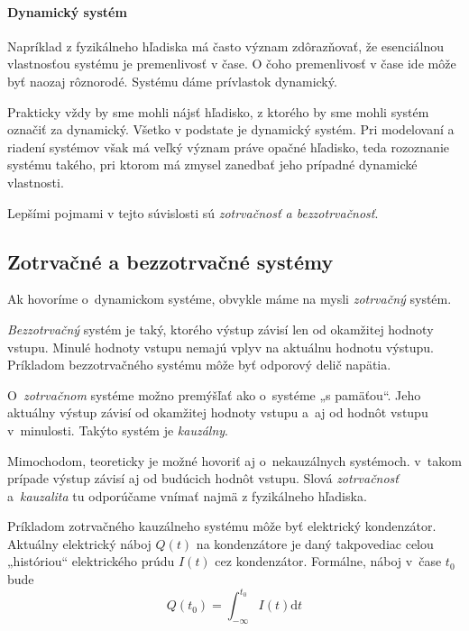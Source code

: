 \documentclass[a4paper, 10pt, ]{article}
\begin{document}
\paragraph{Dynamický systém}

Napríklad z fyzikálneho hľadiska má často význam zdôrazňovať, že esenciálnou vlastnosťou systému je premenlivosť v čase. O čoho premenlivosť v čase ide môže byť naozaj rôznorodé. Systému dáme prívlastok dynamický.

Prakticky vždy by sme mohli nájsť hľadisko, z ktorého by sme mohli systém označiť za dynamický. Všetko v podstate je dynamický systém. Pri modelovaní a riadení systémov však má veľký význam práve opačné hľadisko, teda rozoznanie systému takého, pri ktorom má zmysel zanedbať jeho prípadné dynamické vlastnosti.

Lepšími pojmami v tejto súvislosti sú \emph{zotrvačnosť a bezzotrvačnosť}.



\subsection{Zotrvačné a bezzotrvačné systémy}


Ak hovoríme o~dynamickom systéme, obvykle máme na mysli \emph{zotrvačný} systém.

\emph{Bezzotrvačný} systém je taký, ktorého výstup závisí len od okamžitej hodnoty vstupu. Minulé hodnoty vstupu nemajú vplyv na aktuálnu hodnotu výstupu. Príkladom bezzotrvačného systému môže byť odporový delič napätia.

O~\emph{zotrvačnom} systéme možno premýšľať ako o~systéme „s pamäťou“. Jeho aktuálny výstup závisí od okamžitej hodnoty vstupu a~aj od hodnôt vstupu v~minulosti. Takýto systém je \emph{kauzálny}.


Mimochodom, teoreticky je možné hovoriť aj o~nekauzálnych systémoch. v~takom prípade výstup závisí aj od budúcich hodnôt vstupu. Slová \emph{zotrvačnosť} a~\emph{kauzalita} tu odporúčame vnímať najmä z fyzikálneho hľadiska.

Príkladom zotrvačného kauzálneho systému môže byť elektrický kondenzátor. Aktuálny elektrický náboj $Q(t)$ na kondenzátore je daný takpovediac celou „históriou“ elektrického prúdu $I(t)$ cez kondenzátor. Formálne, náboj v~čase $t_0$ bude
\begin{equation}
    Q(t_0) = \int_{-\infty}^{t_0}I(t) \text{d}t
\end{equation}
\end{document}
